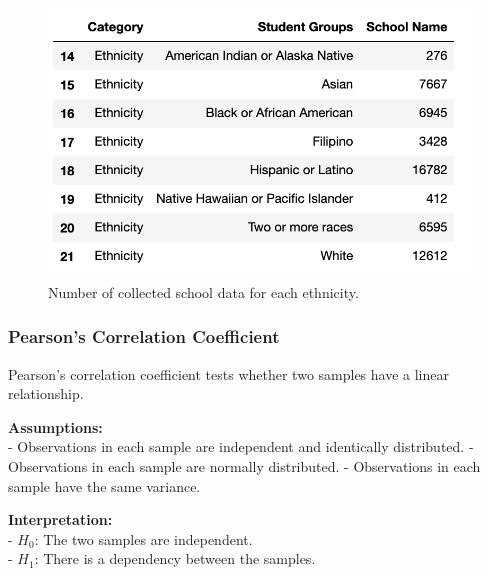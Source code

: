 \documentclass[11pt]{article}
\begin{document}
\begin{figure}[h!]
\centering 
\includegraphics[scale=0.8]{num_ethnicity.png}
\caption{Number of collected school data for each ethnicity.}
  \label{fig:num_ethnicity}
\end{figure}

%
%

\subsubsection{Pearson's Correlation Coefficient}

Pearson's correlation coefficient tests whether two samples have a linear relationship.

\noindent \textbf{Assumptions:}\\
- Observations in each sample are independent and identically distributed.
- Observations in each sample are normally distributed.
- Observations in each sample have the same variance.

\noindent \textbf{Interpretation:}\\
\indent - $H_0$: The two samples are independent.\\
\indent - $H_1$: There is a dependency between the samples.
\end{document}
